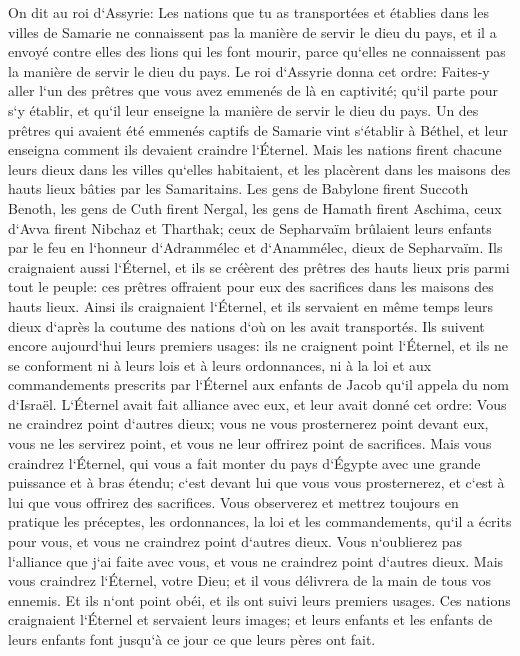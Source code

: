 \verse On dit au roi d`Assyrie: Les nations que tu as transportées et établies dans les villes de Samarie ne connaissent pas la manière de servir le dieu du pays, et il a envoyé contre elles des lions qui les font mourir, parce qu`elles ne connaissent pas la manière de servir le dieu du pays. 
\verse Le roi d`Assyrie donna cet ordre: Faites-y aller l`un des prêtres que vous avez emmenés de là en captivité; qu`il parte pour s`y établir, et qu`il leur enseigne la manière de servir le dieu du pays. 
\verse Un des prêtres qui avaient été emmenés captifs de Samarie vint s`établir à Béthel, et leur enseigna comment ils devaient craindre l`Éternel. 
\verse Mais les nations firent chacune leurs dieux dans les villes qu`elles habitaient, et les placèrent dans les maisons des hauts lieux bâties par les Samaritains. 
\verse Les gens de Babylone firent Succoth Benoth, les gens de Cuth firent Nergal, les gens de Hamath firent Aschima, 
\verse ceux d`Avva firent Nibchaz et Tharthak; ceux de Sepharvaïm brûlaient leurs enfants par le feu en l`honneur d`Adrammélec et d`Anammélec, dieux de Sepharvaïm. 
\verse Ils craignaient aussi l`Éternel, et ils se créèrent des prêtres des hauts lieux pris parmi tout le peuple: ces prêtres offraient pour eux des sacrifices dans les maisons des hauts lieux. 
\verse Ainsi ils craignaient l`Éternel, et ils servaient en même temps leurs dieux d`après la coutume des nations d`où on les avait transportés. 
\verse Ils suivent encore aujourd`hui leurs premiers usages: ils ne craignent point l`Éternel, et ils ne se conforment ni à leurs lois et à leurs ordonnances, ni à la loi et aux commandements prescrits par l`Éternel aux enfants de Jacob qu`il appela du nom d`Israël. 
\verse L`Éternel avait fait alliance avec eux, et leur avait donné cet ordre: Vous ne craindrez point d`autres dieux; vous ne vous prosternerez point devant eux, vous ne les servirez point, et vous ne leur offrirez point de sacrifices. 
\verse Mais vous craindrez l`Éternel, qui vous a fait monter du pays d`Égypte avec une grande puissance et à bras étendu; c`est devant lui que vous vous prosternerez, et c`est à lui que vous offrirez des sacrifices. 
\verse Vous observerez et mettrez toujours en pratique les préceptes, les ordonnances, la loi et les commandements, qu`il a écrits pour vous, et vous ne craindrez point d`autres dieux. 
\verse Vous n`oublierez pas l`alliance que j`ai faite avec vous, et vous ne craindrez point d`autres dieux. 
\verse Mais vous craindrez l`Éternel, votre Dieu; et il vous délivrera de la main de tous vos ennemis. 
\verse Et ils n`ont point obéi, et ils ont suivi leurs premiers usages. 
\verse Ces nations craignaient l`Éternel et servaient leurs images; et leurs enfants et les enfants de leurs enfants font jusqu`à ce jour ce que leurs pères ont fait. 

